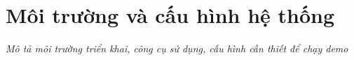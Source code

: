 \chapter{Môi trường và cấu hình hệ thống}
\textit{Mô tả môi trường triển khai, công cụ sử dụng, cấu hình cần thiết để chạy demo}